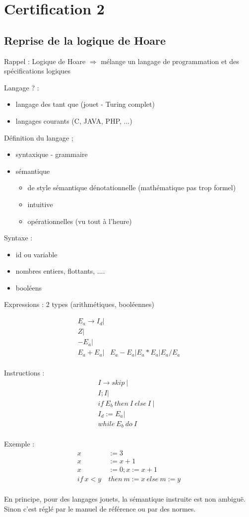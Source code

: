 \documentclass[11pt,a4paper]{article}
\begin{document}
	\section{Certification 2}
	\subsection{Reprise de la logique de Hoare}
	Rappel : Logique de Hoare $\Rightarrow$ mélange un langage de programmation et des spécifications logiques
	
	Langage ? : \begin{itemize}
		\item langage des tant que (jouet - Turing complet)
		\item langages courants (C, JAVA, PHP, ...)
	\end{itemize}

	Définition du langage ;
		\begin{itemize}
			\item syntaxique - grammaire
			\item sémantique 	\begin{itemize}
									\item de style sémantique dénotationnelle (mathématique pas trop formel)
									\item intuitive
									\item opérationnelles (vu tout à l'heure)
								\end{itemize}
		\end{itemize}
	
	Syntaxe : \begin{itemize}
		\item id ou variable
		\item nombres entiers, flottants, ....
		\item booléens
	\end{itemize}

	Expressions : 2 types (arithmétiques, booléennes)
	
	\begin{align*}
		E_a \rightarrow I_d |&\\
							Z |&\\
							-E_a |&\\
							E_a + E_a |& E_a - E_a | E_a * E_a | E_a / E_a\\
	\end{align*}
	
	Instructions :
	\begin{align*}
		I \rightarrow skip\ |&\\
		I; I |&\\
		if\ E_b\ then\ I\ else\ I\ |&\\
		I_d := E_a |&\\
		while\ E_b\ do\ I&\\
	\end{align*}
	
	Exemple :
	\begin{align*}
		x &:= 3\\
		x &:= x + 1\\
		x &:= 0; x:= x + 1\\
		if\ x < y\ &then\ m := x\ else\ m := y\\
	\end{align*}
	
	En principe, pour des langages jouets, la sémantique instruite est non ambiguë.
	Sinon c'est réglé par le manuel de référence ou par des normes.
	
\end{document}
